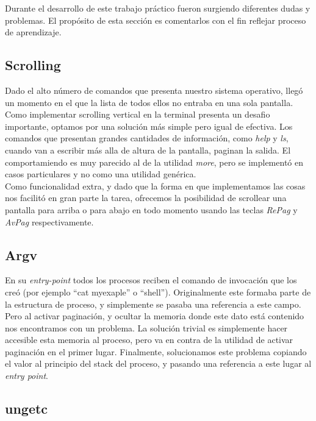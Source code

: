 \documentclass[a4paper,10pt]{article}
\begin{document}
Durante el desarrollo de este trabajo práctico fueron surgiendo diferentes dudas y problemas. El propósito de esta
sección es comentarlos con el fin reflejar proceso de aprendizaje.

        \subsection{Scrolling}
        Dado el alto número de comandos que presenta nuestro sistema operativo, llegó un momento en el que la lista de todos ellos no entraba en una sola pantalla.
        Como implementar scrolling vertical en la terminal presenta un desafio importante, optamos por una solución más simple pero igual de efectiva.
        Los comandos que presentan grandes cantidades de información, como \textit{help} y \textit{ls}, cuando van a escribir más alla de altura de la pantalla, 
        paginan la salida.
        El comportamiendo es muy parecido al de la utilidad \textit{more}, pero se implementó en casos particulares y no como una utilidad genérica. \\


        Como funcionalidad extra, y dado que la forma en que implementamos las cosas nos facilitó en gran parte la tarea, ofrecemos la posibilidad de scrollear una 
        pantalla para arriba o para abajo en todo momento usando las teclas \textit{RePag} y \textit{AvPag} respectivamente.

        \subsection{Argv}
        En su \textit{entry-point} todos los procesos reciben el comando de invocación que los creó (por ejemplo ``cat myexaple'' o ``shell'').
        Originalmente este formaba parte de la estructura de proceso, y simplemente se pasaba una referencia a este campo.
        Pero al activar paginación, y ocultar la memoria donde este dato está contenido nos encontramos con un problema.
        La solución trivial es simplemente hacer accesible esta memoria al proceso, pero va en contra de la utilidad de activar paginación en el primer lugar.
        Finalmente, solucionamos este problema copiando el valor al principio del stack del proceso, y pasando una referencia a este lugar al \textit{entry point}.

	    \subsection{ungetc}
\end{document}

